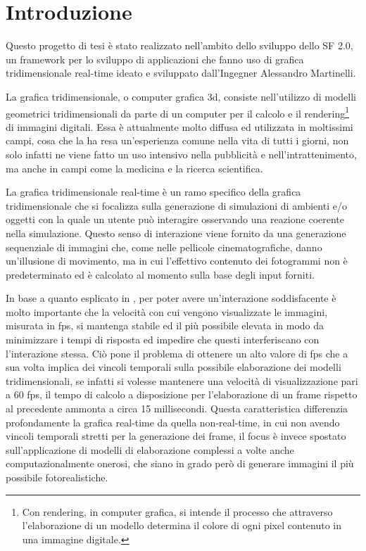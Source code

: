 
\chapter{Introduzione}
\label{ch:introduzione}
Questo progetto di tesi \`e stato realizzato nell'ambito dello sviluppo dello \ac{SF} 2.0, un framework per lo sviluppo di applicazioni che fanno uso di grafica tridimensionale real-time ideato e sviluppato dall'Ingegner Alessandro Martinelli.

La grafica tridimensionale, o computer grafica 3d, consiste nell'utilizzo di modelli geometrici tridimensionali da parte di un computer per il calcolo e il rendering\footnote{Con rendering, in computer grafica, si intende il processo che attraverso l'elaborazione di un modello determina il colore di ogni pixel contenuto in una immagine digitale.\cite{wiki:rendering-it,wiki:rendering-en}} di immagini digitali.
Essa \`e attualmente molto diffusa ed utilizzata in moltissimi campi, cosa che la ha resa un'esperienza comune nella vita di tutti i giorni, non solo infatti ne viene fatto un uso intensivo nella pubblicit\`a e nell'intrattenimento, ma anche in campi come la medicina e la ricerca scientifica.

La grafica tridimensionale real-time \`e un ramo specifico della grafica tridimensionale che si focalizza sulla generazione di simulazioni di ambienti e/o oggetti con la quale un utente pu\`o interagire osservando una reazione coerente nella simulazione. Questo senso di interazione viene fornito da una generazione sequenziale di immagini che, come nelle pellicole cinematografiche, danno un'illusione di movimento, ma in cui l'effettivo contenuto dei fotogrammi non \`e predeterminato ed \`e calcolato al momento sulla base degli input forniti.

In base a quanto esplicato in \cite{book:realtimerendering}, per poter avere un'interazione soddisfacente \`e molto importante che la velocit\`a con cui vengono visualizzate le immagini, misurata in \ac{fps}, si mantenga stabile ed il pi\`u possibile elevata in modo da minimizzare i tempi di risposta ed impedire che questi interferiscano con l'interazione stessa.
Ci\`o pone il problema di ottenere un alto valore di \ac{fps} che a sua volta implica dei vincoli temporali sulla possibile elaborazione dei modelli tridimensionali, se infatti si volesse mantenere una velocit\`a di visualizzazione pari a 60 \ac{fps}, il tempo di calcolo a disposizione per l'elaborazione di un frame rispetto al precedente ammonta a circa 15 millisecondi.
Questa caratteristica differenzia profondamente la grafica real-time da quella non-real-time, in cui non avendo vincoli temporali stretti per la generazione dei frame, il focus \`e invece spostato sull'applicazione di modelli di elaborazione complessi a volte anche computazionalmente onerosi, che siano in grado per\`o di generare immagini il pi\`u possibile fotorealistiche. 

